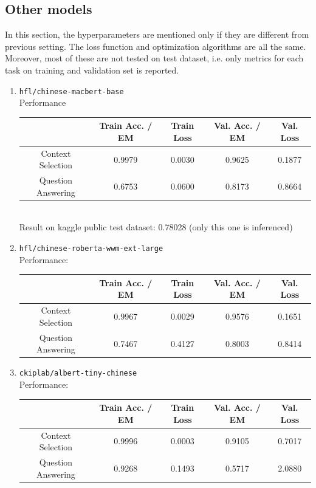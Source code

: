 \documentclass{homeworg}
\newcommand{\hug}{\emoji{hugs}\phantom{x}}
\begin{document}
\subsection{Other models}
In this section, the hyperparameters are mentioned only if they are different from previous setting. The loss function and optimization algorithms are all the same. Moreover, most of these are not tested on test dataset, i.e. only metrics for each task on training and validation set is reported.
\begin{enumerate}
    \item \hug \texttt{hfl/chinese-macbert-base}\\
    Performance\\
        \begin{tabular}{c|c|c|c|c}
            & Train Acc. / EM & Train Loss & Val. Acc. / EM & Val. Loss \\ 
            \hline Context Selection & 0.9979 & 0.0030 & 0.9625 & 0.1877 \\
            \hline Question Answering & 0.6753 & 0.0600 & 0.8173 & 0.8664 
        \end{tabular}\vspace{10pt}\\ 
        Result on kaggle public test dataset:
        0.78028 (only this one is inferenced)
    \item \hug \texttt{hfl/chinese-roberta-wwm-ext-large}\\
        Performance:\\
         \begin{tabular}{c|c|c|c|c}
            & Train Acc. / EM & Train Loss & Val. Acc. / EM & Val. Loss \\ 
            \hline Context Selection & 0.9967 & 0.0029 & 0.9576 & 0.1651 \\
            \hline Question Answering & 0.7467 & 0.4127 & 0.8003 & 0.8414
        \end{tabular}
    \item \texttt{ckiplab/albert-tiny-chinese} \\
        Performance:\\
        \begin{tabular}{c|c|c|c|c}
        & Train Acc. / EM & Train Loss & Val. Acc. / EM & Val. Loss \\ 
        \hline Context Selection & 0.9996 & 0.0003 & 0.9105 & 0.7017 \\
        \hline Question Answering & 0.9268 & 0.1493 & 0.5717 & 2.0880 
    \end{tabular}
\end{enumerate}
\newpage
\end{document}
